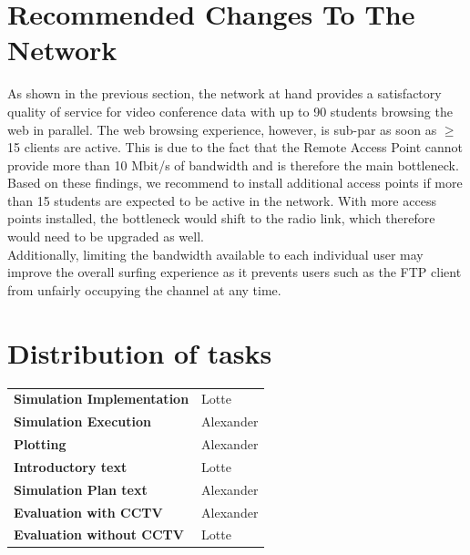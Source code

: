 \documentclass[
10pt, %
a4paper, %
oneside, %
headinclude,footinclude, %
BCOR5mm, %
]{scrartcl}
\begin{document}
\section{Recommended Changes To The Network}
As shown in the previous section, the network at hand provides a satisfactory quality of service for video conference data with up to 90 students browsing the web in parallel. The web browsing experience, however, is sub-par as soon as $\geq$ 15 clients are active. This is due to the fact that the Remote Access Point cannot provide more than 10 Mbit/s of bandwidth and is therefore the main bottleneck.\\
Based on these findings, we recommend to install additional access points if more than 15 students are expected to be active in the network. With more access points installed, the bottleneck would shift to the radio link, which therefore would need to be upgraded as well.\\
Additionally, limiting the bandwidth available to each individual user may improve the overall surfing experience as it prevents users such as the FTP client from unfairly occupying the channel at any time.

\newpage

\section{Distribution of tasks}

\begin{table}[H]
\begin{tabularx}{\textwidth}{ l l }
  \textbf{Simulation Implementation} & Lotte \\
  \textbf{Simulation Execution} & Alexander \\
  \textbf{Plotting} & Alexander \\
  \textbf{Introductory text} & Lotte \\
  \textbf{Simulation Plan text} & Alexander \\
  \textbf{Evaluation with CCTV} & Alexander \\
  \textbf{Evaluation without CCTV} & Lotte \\
\end{tabularx}
\end{table}
\end{document}
